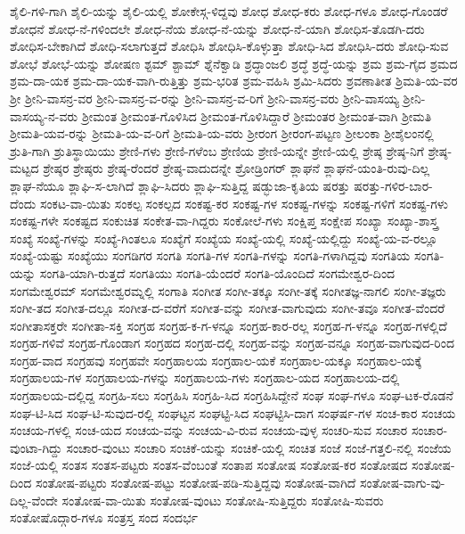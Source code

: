 {ಶೈಲಿ-ಗಳಿ-ಗಾಗಿ
ಶೈಲಿ-ಯನ್ನು
ಶೈಲಿ-ಯಲ್ಲಿ
ಶೋಕೇಸ್ಗ-ಳಿದ್ದವು
ಶೋಧ
ಶೋಧ-ಕರು
ಶೋಧ-ಗಳೂ
ಶೋಧ-ಗೊಂಡರೆ
ಶೋಧನೆ
ಶೋಧ-ನೆ-ಗಳಿಂದಲೇ
ಶೋಧ-ನೆಯ
ಶೋಧ-ನೆ-ಯನ್ನು
ಶೋಧ-ನೆ-ಯಾಗಿ
ಶೋಧಿಸ-ತೊಡಗಿ-ದರು
ಶೋಧಿಸ-ಬೇಕಾಗಿದೆ
ಶೋಧಿ-ಸಲಾಗುತ್ತದೆ
ಶೋಧಿಸಿ
ಶೋಧಿಸಿ-ಕೊಳ್ಳುತ್ತಾ
ಶೋಧಿ-ಸಿದ
ಶೋಧಿಸಿ-ದರು
ಶೋಧಿ-ಸುವ
ಶೋಭೆ
ಶೋಭೆ-ಯನ್ನು
ಶೋಷಣ
ಶ್ಟಮ್
ಶ್ಟಾಮ್
ಶ್ನೆನೆಕ್ವಾಡಿ
ಶ್ರದ್ಧಾಂಜಲಿ
ಶ್ರದ್ಧೆ
ಶ್ರದ್ಧೆ-ಯನ್ನು
ಶ್ರಮ
ಶ್ರಮ-ಗೈದ
ಶ್ರಮದ
ಶ್ರಮ-ದಾ-ಯಕ
ಶ್ರಮ-ದಾ-ಯಕ-ವಾಗಿ-ರುತ್ತಿತ್ತು
ಶ್ರಮ-ಭರಿತ
ಶ್ರಮ-ವಹಿಸಿ
ಶ್ರಮಿ-ಸಿದರು
ಶ್ರವಣಾತೀತ
ಶ್ರಿಮತಿ-ಯ-ವರ
ಶ್ರೀ
ಶ್ರೀನಿ-ವಾಸನ್ರ-ವರ
ಶ್ರೀನಿ-ವಾಸನ್ರ-ವ-ರನ್ನು
ಶ್ರೀನಿ-ವಾಸನ್ರ-ವ-ರಿಗೆ
ಶ್ರೀನಿ-ವಾಸನ್ರ-ವರು
ಶ್ರೀನಿ-ವಾಸಯ್ಯ
ಶ್ರೀನಿ-ವಾಸಯ್ಯ-ನ-ವರು
ಶ್ರೀಮಂತ
ಶ್ರೀಮಂತ-ಗೊಳಿಸಿದ
ಶ್ರೀಮಂತ-ಗೊಳಿಸಿದ್ದಾರೆ
ಶ್ರೀಮಂತರ
ಶ್ರೀಮಂತ-ವಾಗಿ
ಶ್ರೀಮತಿ
ಶ್ರೀಮತಿ-ಯವ-ರನ್ನು
ಶ್ರೀಮತಿ-ಯ-ವ-ರಿಗೆ
ಶ್ರೀಮತಿ-ಯ-ವರು
ಶ್ರೀರಂಗ
ಶ್ರೀರಂಗ-ಪಟ್ಟಣ
ಶ್ರೀಲಂಕಾ
ಶ್ರೀಶೈಲಂನಲ್ಲಿ
ಶ್ರುತಿ-ಗಾಗಿ
ಶ್ರುತಿಸ್ಥಾಯಿಯು
ಶ್ರೇಣಿ-ಗಳು
ಶ್ರೇಣಿ-ಗಳೆಂಬ
ಶ್ರೇಣಿಯ
ಶ್ರೇಣಿ-ಯನ್ನೇ
ಶ್ರೇಣಿ-ಯಲ್ಲಿ
ಶ್ರೇಷ್ಠ
ಶ್ರೇಷ್ಠ-ನಿಗೆ
ಶ್ರೇಷ್ಠ-ಮಟ್ಟದ
ಶ್ರೇಷ್ಠರ
ಶ್ರೇಷ್ಠರು
ಶ್ರೇಷ್ಠ-ರೆಂದರೆ
ಶ್ರೇಷ್ಠ-ವಾದುದನ್ನೇ
ಶ್ರೋಡ್ರಿಂಗರ್
ಶ್ಲಾಘನೆ
ಶ್ಲಾಘನೆ-ಯಂತಿ-ರುವು-ದಿಲ್ಲ
ಶ್ಲಾಘ-ನೆಯೂ
ಶ್ಲಾಘಿ-ಸ-ಲಾಗಿದೆ
ಶ್ಲಾಘಿ-ಸಿದರು
ಶ್ಲಾಘಿ-ಸುತ್ತಿದ್ದ
ಷಡ್ಭುಜಾ-ಕೃತಿಯ
ಷರತ್ತು
ಷರತ್ತು-ಗಳಿರ-ಬಾರ-ದೆಂದು
ಸಂಕಟ-ವಾ-ಯಿತು
ಸಂಕಲ್ಪ
ಸಂಕಲ್ಪದ
ಸಂಕಷ್ಟ-ಕರ
ಸಂಕಷ್ಟ-ಗಳ
ಸಂಕಷ್ಟ-ಗಳನ್ನು
ಸಂಕಷ್ಟ-ಗಳಿಗೆ
ಸಂಕಷ್ಟ-ಗಳು
ಸಂಕಷ್ಟ-ಗಳೇ
ಸಂಕಷ್ಟದ
ಸಂಕುಚಿತ
ಸಂಕೇತ-ವಾ-ಗಿದ್ದರು
ಸಂಕೋಲೆ-ಗಳು
ಸಂಕ್ಷಿಪ್ತ
ಸಂಕ್ಷೇಪ
ಸಂಖ್ಯಾ
ಸಂಖ್ಯಾ-ಶಾಸ್ತ್ರ
ಸಂಖ್ಯೆ
ಸಂಖ್ಯೆ-ಗಳನ್ನು
ಸಂಖ್ಯೆ-ಗಿಂತಲೂ
ಸಂಖ್ಯೆಗೆ
ಸಂಖ್ಯೆಯ
ಸಂಖ್ಯೆ-ಯಲ್ಲಿ
ಸಂಖ್ಯೆ-ಯಲ್ಲಿದ್ದು
ಸಂಖ್ಯೆ-ಯ-ವ-ರಲ್ಲೂ
ಸಂಖ್ಯೆ-ಯಷ್ಟು
ಸಂಖ್ಯೆಯು
ಸಂಗಡಿಗರ
ಸಂಗತಿ
ಸಂಗತಿ-ಗಳ
ಸಂಗತಿ-ಗಳನ್ನು
ಸಂಗತಿ-ಗಳಾಗಿದ್ದವು
ಸಂಗತಿಯ
ಸಂಗತಿ-ಯನ್ನು
ಸಂಗತಿ-ಯಾಗಿ-ರುತ್ತದೆ
ಸಂಗತಿಯು
ಸಂಗತಿ-ಯೆಂದರೆ
ಸಂಗತಿ-ಯೊಂದಿದೆ
ಸಂಗಮೇಶ್ವರ-ದಿಂದ
ಸಂಗಮೇಶ್ವರಮ್
ಸಂಗಮೇಶ್ವರಮ್ನಲ್ಲಿ
ಸಂಗಾತಿ
ಸಂಗೀತ
ಸಂಗೀ-ತಕ್ಕೂ
ಸಂಗೀ-ತಕ್ಕೆ
ಸಂಗೀತಜ್ಞ-ನಾಗಲಿ
ಸಂಗೀ-ತಜ್ಞರು
ಸಂಗೀ-ತದ
ಸಂಗೀತ-ದಲ್ಲೂ
ಸಂಗೀತ-ದ-ವರೆಗೆ
ಸಂಗೀತ-ವನ್ನು
ಸಂಗೀತ-ವಾಗುವುದು
ಸಂಗೀ-ತವೂ
ಸಂಗೀತ-ವೆಂದರೆ
ಸಂಗೀತಾಸಕ್ತರೇ
ಸಂಗೀತಾ-ಸಕ್ತಿ
ಸಂಗ್ರಹ
ಸಂಗ್ರಹ-ಕ-ಗ-ಳನ್ನೂ
ಸಂಗ್ರಹ-ಕಾರ-ರಲ್ಲ
ಸಂಗ್ರಹ-ಗ-ಳನ್ನೂ
ಸಂಗ್ರಹ-ಗಳಲ್ಲಿದೆ
ಸಂಗ್ರಹ-ಗಳಿವೆ
ಸಂಗ್ರಹ-ಗೊಂಡಾಗ
ಸಂಗ್ರಹದ
ಸಂಗ್ರಹ-ದಲ್ಲಿ
ಸಂಗ್ರಹ-ವನ್ನು
ಸಂಗ್ರಹ-ವನ್ನೂ
ಸಂಗ್ರಹ-ವಾಗುವುದ-ರಿಂದ
ಸಂಗ್ರಹ-ವಾದ
ಸಂಗ್ರಹವು
ಸಂಗ್ರಹವೇ
ಸಂಗ್ರಹಾಲಯ
ಸಂಗ್ರಹಾಲ-ಯಕೆ
ಸಂಗ್ರಹಾಲ-ಯಕ್ಕೂ
ಸಂಗ್ರಹಾಲ-ಯಕ್ಕೆ
ಸಂಗ್ರಹಾಲಯ-ಗಳ
ಸಂಗ್ರಹಾಲಯ-ಗಳನ್ನು
ಸಂಗ್ರಹಾಲಯ-ಗಳು
ಸಂಗ್ರಹಾಲ-ಯದ
ಸಂಗ್ರಹಾಲಯ-ದಲ್ಲಿ
ಸಂಗ್ರಹಾಲಯ-ದಲ್ಲಿದ್ದ
ಸಂಗ್ರಹಿ-ಸಲು
ಸಂಗ್ರಹಿಸಿ
ಸಂಗ್ರಹಿ-ಸಿದ
ಸಂಗ್ರಹಿಸಿದ್ದೇನೆ
ಸಂಘ
ಸಂಘ-ಗಳೂ
ಸಂಘ-ಟಕ-ರೊಡನೆ
ಸಂಘ-ಟಿ-ಸಿದ
ಸಂಘ-ಟಿ-ಸುವುದ-ರಲ್ಲಿ
ಸಂಘಟ್ಟನ
ಸಂಘಟ್ಟಿ-ಸಿದ
ಸಂಘಟ್ಟಿಸಿ-ದಾಗ
ಸಂಘರ್ಷ-ಗಳ
ಸಂಚ-ಕಾರ
ಸಂಚಯ
ಸಂಚಯ-ಗಳಲ್ಲಿ
ಸಂಚ-ಯದ
ಸಂಚಯ-ವನ್ನು
ಸಂಚಯ-ವಿ-ರುವ
ಸಂಚಯ-ವುಳ್ಳ
ಸಂಚರಿ-ಸುವ
ಸಂಚಾರ
ಸಂಚಾರ-ವುಂಟಾ-ಗಿದ್ದು
ಸಂಚಾರ-ವುಂಟು
ಸಂಚಾರಿ
ಸಂಚಿಕೆ-ಯನ್ನು
ಸಂಚಿಕೆ-ಯಲ್ಲಿ
ಸಂಚಿತ
ಸಂಜೆ
ಸಂಜೆ-ಗತ್ತಲಿ-ನಲ್ಲಿ
ಸಂಜೆಯ
ಸಂಜೆ-ಯಲ್ಲಿ
ಸಂತಸ
ಸಂತಸ-ಪಟ್ಟರು
ಸಂತಸ-ವೆಂಬಂತೆ
ಸಂತಾಪ
ಸಂತೋಷ
ಸಂತೋಷ-ಕರ
ಸಂತೋಷದ
ಸಂತೋಷ-ದಿಂದ
ಸಂತೋಷ-ಪಟ್ಟರು
ಸಂತೋಷ-ಪಟ್ಟು
ಸಂತೋಷ-ಪಡಿ-ಸುತ್ತಿದ್ದವು
ಸಂತೋಷ-ವಾಗಿದೆ
ಸಂತೋಷ-ವಾಗು-ವು-ದಿಲ್ಲ-ವೆಂದೇ
ಸಂತೋಷ-ವಾ-ಯಿತು
ಸಂತೋಷ-ವುಂಟು
ಸಂತೋಷಿ-ಸುತ್ತಿದ್ದರು
ಸಂತೋಷಿ-ಸುವರು
ಸಂತೋಷೊದ್ಗಾರ-ಗಳೂ
ಸಂತ್ರಸ್ತ
ಸಂದ
ಸಂದರ್ಭ
}
